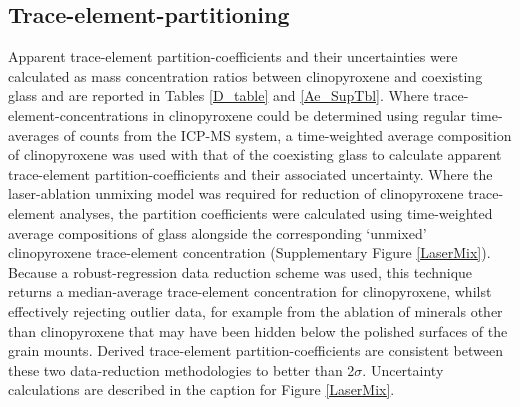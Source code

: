 \documentclass[review,authoryear,12pt]{elsarticle}
\begin{document}
\subsection{Trace-element-partitioning}
Apparent trace-element partition-coefficients and their uncertainties were calculated as mass concentration ratios between clinopyroxene and coexisting glass and 
 are reported in Tables \ref{D_table} and \ref{Ae_SupTbl}. 
	 Where trace-element-concentrations in clinopyroxene could be determined using regular time-averages of counts from the ICP-MS system, a time-weighted average composition of clinopyroxene was used with that of the coexisting glass to calculate apparent trace-element partition-coefficients and their associated uncertainty. Where the laser-ablation unmixing model was required for reduction of clinopyroxene trace-element analyses, the partition coefficients were calculated using time-weighted average compositions of glass alongside the corresponding `unmixed' clinopyroxene trace-element concentration (Supplementary Figure \ref{LaserMix}). Because a robust-regression data reduction scheme was used, this technique returns a median-average trace-element concentration for clinopyroxene, whilst effectively rejecting outlier data, for example from the ablation of minerals other than clinopyroxene that may have been hidden below the polished surfaces of the grain mounts. Derived  trace-element partition-coefficients are consistent between these two data-reduction methodologies to better than 2$\sigma$. Uncertainty calculations are described in the caption for Figure \ref{LaserMix}.
\end{document}
